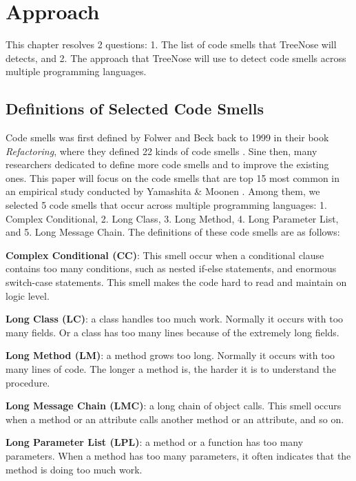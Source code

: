 \section{Approach}
\label{sec:approach}

This chapter resolves 2 questions: 1. The list of code smells that TreeNose will detects, 
and 2. The approach that TreeNose will use to detect code smells across multiple programming languages.


\subsection{Definitions of Selected Code Smells}
\label{sec:Definitions of Selected Code Smells}

Code smells was first defined by Folwer and Beck back to 1999 in their book \textit{Refactoring}, 
where they defined 22 kinds of code smells \cite{Fowler_Beck}. Sine then, many researchers dedicated to define more 
code smells and to improve the existing ones. This paper will focus on the code smells that are top 15 most common in 
an empirical study conducted by Yamashita \& Moonen \cite{6405287}.
Among them, we selected 5 code smells that occur across multiple programming languages: 1. Complex Conditional, 2. Long Class,
3. Long Method, 4. Long Parameter List, and 5. Long Message Chain. The definitions of these code smells are as follows:

\textbf{Complex Conditional (CC)}: This smell occur when a conditional clause contains too many conditions, 
such as nested if-else statements, and enormous switch-case statements. This smell makes the code hard to read and maintain on logic level.

\textbf{Long Class (LC)}: a class handles too much work. Normally it occurs with too many fields. Or a class has too many lines because of 
the extremely long fields. 

\textbf{Long Method (LM)}: a method grows too long. Normally it occurs with too many lines of code. The longer a method is, the harder it is to understand the procedure.

\textbf{Long Message Chain (LMC)}: a long chain of object calls. This smell occurs when a method or an attribute calls another method or an attribute, and so on.

\textbf{Long Parameter List (LPL)}: a method or a function has too many parameters. When a method has too many parameters, it often indicates that the method is doing too much work.

